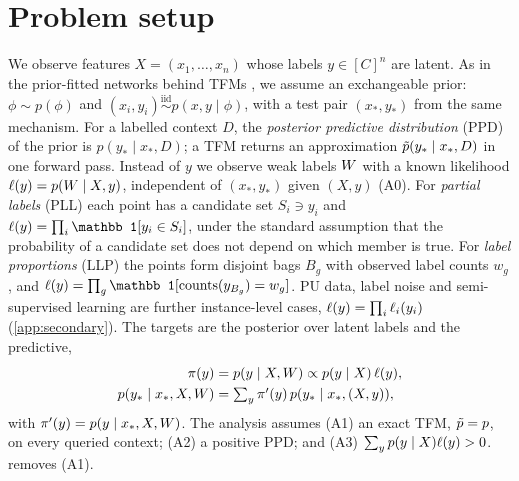 \section{Problem setup}\label{sec:setup}
We observe features $X=(x_1,\dots,x_n)$ whose labels $y\in[C]^n$ are latent. As in the prior-fitted networks behind
TFMs \citep{muller2022pfn}, we assume an exchangeable prior: $\phi\sim p(\phi)$ and
$(x_i,y_i)\overset{\text{iid}}{\sim}p(x,y\mid\phi)$, with a test pair $(x_*,y_*)$ from the same mechanism. For a labelled
context $D$, the \emph{posterior predictive distribution} (PPD) of the prior is $p(y_*\mid x_*,D)$; a TFM returns an
approximation $\tilde p(y_*\mid x_*,D)$ in one forward pass. Instead of $y$ we observe weak labels $W$ with a known
likelihood $\ell(y)=p(W\mid X,y)$, independent of $(x_*,y_*)$ given $(X,y)$ (A0). For \emph{partial labels} (PLL) each
point has a candidate set $S_i\ni y_i$ and $\lik(y)=\prod_i\mathbb 1[y_i\in S_i]$, under the standard assumption that the
probability of a candidate set does not depend on which member is true. For \emph{label proportions} (LLP) the points
form disjoint bags $B_g$ with observed label counts $w_g$, and
$\lik(y)=\prod_g\mathbb 1[\mathrm{counts}(y_{B_g})=w_g]$. PU data, label noise and semi-supervised learning are further
instance-level cases, $\ell(y)=\prod_i\ell_i(y_i)$ (\cref{app:secondary}). The targets are the posterior
over latent labels and the predictive,
\begin{equation}\label{eq:target}
\begin{aligned}
  \pi(y)&=p(y\mid X,W)\propto p(y\mid X)\,\ell(y),\\
  p(y_*\mid x_*,X,W)&=\textstyle\sum_y \pi'(y)\,p(y_*\mid x_*,(X,y)),
\end{aligned}
\end{equation}
with $\pi'(y)=p(y\mid x_*,X,W)$. The analysis assumes (A1) an exact TFM, $\tilde p=p$, on every queried context;
(A2) a positive PPD; and (A3) $\sum_y p(y\mid X)\ell(y)>0$.  removes (A1).
